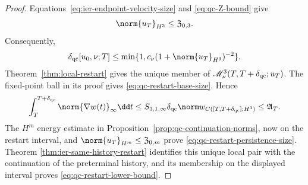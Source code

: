 \begin{proof}
Equations~\eqref{eq:ier-endpoint-velocity-size} and
\eqref{eq:qc-Z-bound} give
\[
 \norm{u_T}_{H^3}\le\mathfrak Z_{0,3}.
\]
Consequently,
\[
 \delta_{\rm qc}[u_0,\nu;T]
 \le\min\{1,c_\nu(1+\norm{u_T}_{H^3})^{-2}\}.
\]
Theorem~\ref{thm:local-restart} gives the unique member of
\(\mathscr M_\nu^3(T,T+\delta_{\rm qc};u_T)\).  The fixed-point ball in its
proof gives
\eqref{eq:qc-restart-base-size}.  Hence
\[
 \int_T^{T+\delta_{\rm qc}}\norm{\nabla w(t)}_\infty\dd t
 \le S_{3,1,\infty}\delta_{\rm qc}
 \norm w_{C([T,T+\delta_{\rm qc}];H^3)}
 \le\mathfrak A_T.
\]
The \(H^m\) energy estimate in
Proposition~\ref{prop:qc-continuation-norms}, now on the restart interval,
and \(\norm{u_T}_{H^m}\le\mathfrak Z_{0,m}\) prove
\eqref{eq:qc-restart-persistence-size}.  Theorem
\ref{thm:ier-same-history-restart} identifies this unique local pair with the
continuation of the preterminal history, and its membership on the displayed
interval proves \eqref{eq:qc-restart-lower-bound}.
\end{proof}

